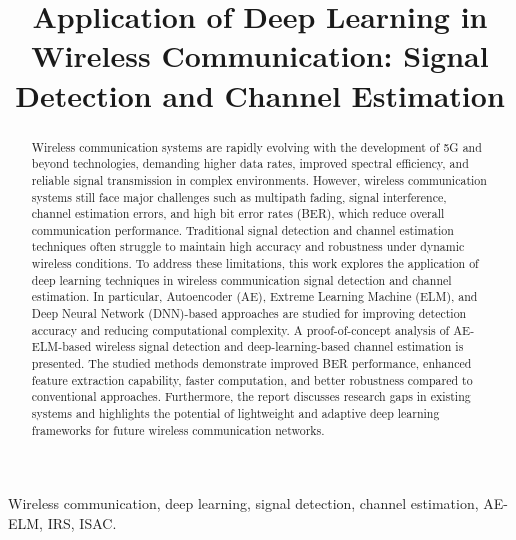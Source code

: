 \documentclass[10pt, conference]{IEEEtran}
\begin{document}
\setlength{\abovedisplayskip}{5pt}
\setlength{\belowdisplayskip}{5pt}
\setlength{\floatsep}{5 pt}
\setlength{\textfloatsep}{4 pt}

\title{Application of Deep Learning in Wireless Communication: Signal Detection and Channel Estimation}

\author{
}

\maketitle
\begin{abstract}
Wireless communication systems are rapidly evolving with the development of 5G and beyond technologies, demanding higher data rates, improved spectral efficiency, and reliable signal transmission in complex environments. However, wireless communication systems still face major challenges such as multipath fading, signal interference, channel estimation errors, and high bit error rates (BER), which reduce overall communication performance. Traditional signal detection and channel estimation techniques often struggle to maintain high accuracy and robustness under dynamic wireless conditions. To address these limitations, this work explores the application of deep learning techniques in wireless communication signal detection and channel estimation. In particular, Autoencoder (AE), Extreme Learning Machine (ELM), and Deep Neural Network (DNN)-based approaches are studied for improving detection accuracy and reducing computational complexity. A proof-of-concept analysis of AE-ELM-based wireless signal detection and deep-learning-based channel estimation is presented. The studied methods demonstrate improved BER performance, enhanced feature extraction capability, faster computation, and better robustness compared to conventional approaches. Furthermore, the report discusses research gaps in existing systems and highlights the potential of lightweight and adaptive deep learning frameworks for future wireless communication networks.
\end{abstract}

\begin{IEEEkeywords}
Wireless communication, deep learning, signal detection, channel estimation, AE-ELM, IRS, ISAC.
\end{IEEEkeywords}
\end{document}
